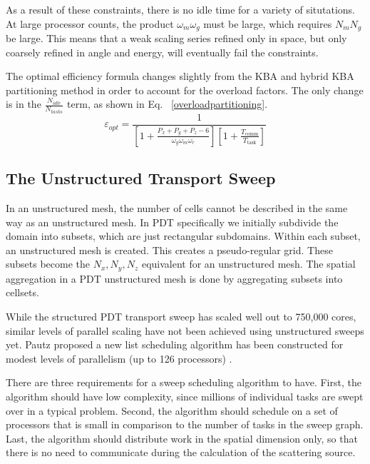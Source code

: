 \documentclass[11pt, letterpaper,titlepage,oneside]{article}
\begin{document}
As a result of these constraints, there is no idle time for a variety of situtations. At large processor counts, the product $\omega_m \omega_g$ must be large, which requires $N_m N_g$ be large. This means that a weak scaling series refined only in space, but only coarsely refined in angle and energy, will eventually fail the constraints.

The optimal efficiency formula changes slightly from the KBA and hybrid KBA partitioning method in order to account for the overload factors. The only change is in the $\frac{N_{idle}}{N_{tasks}}$ term, as shown in Eq. ~\eqref{overloadpartitioning}. 
\begin{equation}
\varepsilon_{opt} = \frac{1}{[1+\frac{P_x+P_y+P_z-6}{\omega_g \omega_m \omega_r}][1+\frac{T_{\text{comm}}}{T_{\text{task}}}]}
\label{overloadpartitioning}
\end{equation}


\subsection{The Unstructured Transport Sweep}
In an unstructured mesh, the number of cells cannot be described in the same way as an unstructured mesh. In PDT specifically we initially subdivide the domain into subsets, which are just rectangular subdomains. Within each subset, an unstructured mesh is created. This creates a pseudo-regular grid. These subsets become the $N_x, N_y, N_z$ equivalent for an unstructured mesh. The spatial aggregation in a PDT unstructured mesh is done by aggregating subsets into cellsets. 

While the structured PDT transport sweep has scaled well out to 750,000 cores, similar levels of parallel scaling have not been achieved using unstructured sweeps yet. Pautz proposed a new list scheduling algorithm has been constructed for modest levels of parallelism (up to 126 processors)\cite{Pautz} .

There are three requirements for a sweep scheduling algorithm to have. First, the algorithm should have low complexity, since millions of individual tasks are swept over in a typical problem. Second, the algorithm should schedule on a set of processors that is small in comparison to the number of tasks in the sweep graph. Last, the algorithm should distribute work in the spatial dimension only, so that there is no need to communicate during the calculation of the scattering source. 
\end{document}
